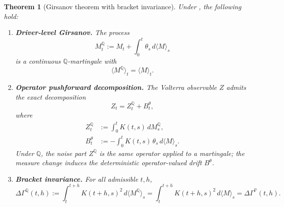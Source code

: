 \documentclass[11pt]{article}
\theoremstyle{plain}
\newtheorem{theorem}{Theorem}[section]
\theoremstyle{definition}
\theoremstyle{remark}
\newcommand{\PP}{\mathbb{P}}
\newcommand{\QQ}{\mathbb{Q}}
\newcommand{\dGamma}{\Delta\Gamma}
\newcommand{\bracket}[1]{\langle #1 \rangle}
\begin{document}
\begin{theorem}[Girsanov theorem with bracket invariance]\label{thm:girsanov-main}
Under , the following hold:

\begin{enumerate}[label=(\arabic*)]
\item \textbf{Driver-level Girsanov.} The process
\begin{equation}\label{eq:MQ-def}
M_t^{\QQ} := M_t + \int_0^t \theta_s\,d\bracket{M}_s
\end{equation}
is a continuous $\QQ$-martingale with
\begin{equation}\label{eq:bracket-preserved}
\bracket{M^{\QQ}}_t = \bracket{M}_t.
\end{equation}

\item \textbf{Operator pushforward decomposition.} The Volterra observable
$Z$ admits the exact decomposition
\begin{equation}\label{eq:Z-decomp}
Z_t = Z_t^{\QQ} + B_t^\theta,
\end{equation}
where
\begin{align}
Z_t^{\QQ} &:= \int_0^t K(t,s)\,dM_s^{\QQ}, \label{eq:ZQ-def} \\
B_t^\theta &:= -\int_0^t K(t,s)\,\theta_s\,d\bracket{M}_s. \label{eq:Btheta-def}
\end{align}
Under $\QQ$, the noise part $Z^{\QQ}$ is the same operator applied to a
martingale; the measure change induces the deterministic operator-valued
drift $B^\theta$.

\item \textbf{Bracket invariance.} For all admissible $t, h$,
\begin{equation}\label{eq:DG-invariance}
\dGamma^{\QQ}(t,h) := \int_t^{t+h} K(t+h,s)^2\,d\bracket{M^{\QQ}}_s
= \int_t^{t+h} K(t+h,s)^2\,d\bracket{M}_s = \dGamma^{\PP}(t,h).
\end{equation}
\end{enumerate}
\end{theorem}
\end{document}
